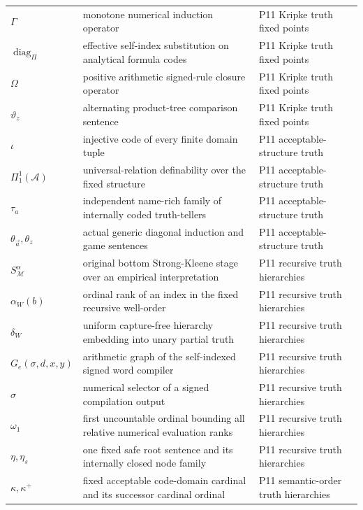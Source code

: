 \begin{longtable}{@{}p{}p{}p{}@{}}
\(\Gamma\) & monotone numerical induction operator & P11 Kripke truth fixed points \\
\(\operatorname{diag}_{\Pi}\) & effective self-index substitution on analytical formula codes & P11 Kripke truth fixed points \\
\(\Omega\) & positive arithmetic signed-rule closure operator & P11 Kripke truth fixed points \\
\(\vartheta_z\) & alternating product-tree comparison sentence & P11 Kripke truth fixed points \\
\(\iota\) & injective code of every finite domain tuple & P11 acceptable-\allowbreak{}structure truth \\
\(\Pi^1_1(\mathcal A)\) & universal-relation definability over the fixed structure & P11 acceptable-\allowbreak{}structure truth \\
\(\tau_a\) & independent name-rich family of internally coded truth-tellers & P11 acceptable-\allowbreak{}structure truth \\
\(\theta_{\vec a},\allowbreak \theta_z\) & actual generic diagonal induction and game sentences & P11 acceptable-\allowbreak{}structure truth \\
\(S_{\mathcal M}^{\alpha}\) & original bottom Strong-Kleene stage over an empirical interpretation & P11 recursive truth hierarchies \\
\(\alpha_W(b)\) & ordinal rank of an index in the fixed recursive well-order & P11 recursive truth hierarchies \\
\(\delta_W\) & uniform capture-free hierarchy embedding into unary partial truth & P11 recursive truth hierarchies \\
\(G_e(\sigma,\allowbreak d,\allowbreak x,\allowbreak y)\) & arithmetic graph of the self-indexed signed word compiler & P11 recursive truth hierarchies \\
\(\sigma\) & numerical selector of a signed compilation output & P11 recursive truth hierarchies \\
\(\omega_1\) & first uncountable ordinal bounding all relative numerical evaluation ranks & P11 recursive truth hierarchies \\
\(\eta,\allowbreak \eta_s\) & one fixed safe root sentence and its internally closed node family & P11 recursive truth hierarchies \\
\(\kappa,\allowbreak \kappa^+\) & fixed acceptable code-domain cardinal and its successor cardinal ordinal & P11 semantic-\allowbreak{}order truth hierarchies \\

\end{longtable}
